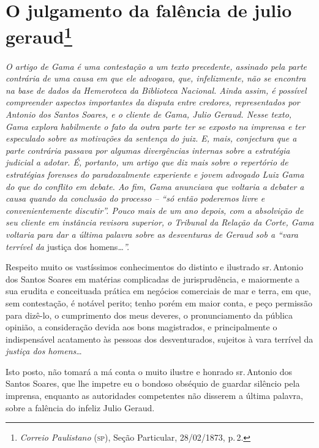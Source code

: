 \chapter{O julgamento da falência de julio geraud\footnote{\emph{Correio Paulistano} (\textsc{sp}), Seção Particular,
  28/02/1873, p.\,2.}} %

\begin{didascalia}
\emph{O artigo de Gama é uma contestação a um texto precedente, assinado
pela parte contrária de uma causa em que ele advogava, que,
infelizmente, não se encontra na base de dados da Hemeroteca da
Biblioteca Nacional. Ainda assim, é possível compreender aspectos
importantes da disputa entre credores, representados por Antonio dos
Santos Soares, e o cliente de Gama, Julio Geraud. Nesse texto, Gama
explora habilmente o fato da outra parte ter se exposto na imprensa e
ter especulado sobre as motivações da sentença do juiz. E, mais,
conjectura que a parte contrária passava por algumas divergências
internas sobre a estratégia judicial a adotar. É, portanto, um artigo
que diz mais sobre o repertório de estratégias forenses do
paradoxalmente experiente e jovem advogado Luiz Gama do que do conflito
em debate. Ao fim, Gama anunciava que voltaria a debater a causa quando
da conclusão do processo -- ``só então poderemos livre e convenientemente
discutir''. Pouco mais de um ano depois, com a absolvição de seu cliente
em instância revisora superior, o Tribunal da Relação da Corte, Gama
voltaria para dar a última palavra sobre as desventuras de Geraud sob a
``vara terrível da} justiça dos homens\ldots{}\emph{''.}
\end{didascalia}

Respeito muito os vastíssimos conhecimentos do distinto e ilustrado sr.\,Antonio dos Santos Soares em matérias complicadas de jurisprudência, e
maiormente a sua erudita e conceituada prática em negócios comerciais de
mar e terra, em que, sem contestação, é notável perito; tenho porém em
maior conta, e peço permissão para dizê-lo, o cumprimento dos meus
deveres, o pronunciamento da pública opinião, a consideração devida aos
bons magistrados, e principalmente o indispensável acatamento às pessoas
dos desventurados, sujeitos à vara terrível da \emph{justiça dos
homens}\ldots{}

Isto posto, não tomará a má conta o muito ilustre e honrado sr.\,Antonio
dos Santos Soares, que lhe impetre eu o bondoso obséquio de guardar
silêncio pela imprensa, enquanto as autoridades competentes não disserem
a última palavra, sobre a falência do infeliz Julio Geraud.

